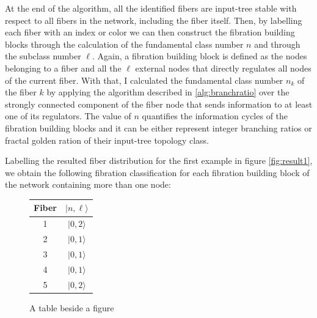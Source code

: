 \documentclass[12pt]{diazessay} %
\begin{document}
At the end of the algorithm, all the identified fibers are input-tree stable with respect to all fibers in the network, including the fiber itself. Then, by labelling each fiber with an index or color we can then construct the fibration building blocks through the calculation of the fundamental class number $n$ and through the subclass number $\ell$. Again, a fibration building block is defined as the nodes belonging to a fiber and all the $\ell$ external nodes that directly regulates all nodes of the current fiber. With that, I calculated the fundamental class number $n_k$ of the fiber $k$ by applying the algorithm described in \ref{alg:branchratio} over the strongly connected component of the fiber node that sends information to at least one of its regulators. The value of $n$ quantifies the information cycles of the fibration building blocks and it can be either represent integer branching ratios or fractal golden ration of their input-tree topology class.

Labelling the resulted fiber distribution for the first example in figure \ref{fig:result1}, we obtain the following fibration classification for each fibration building block of the network containing more than one node:

\begin{figure}[!ht]
    \centering
    \qquad
    \begin{tabular}[b]{cc}\hline
      Fiber & $| n, \ell \rangle$  \\ \hline
      1 & $| 0, 2 \rangle$ \\
      2 & $| 0, 1 \rangle$ \\
      3 & $| 0, 1 \rangle$ \\ 
      4 & $| 0, 1 \rangle$ \\
      5 & $| 0, 2 \rangle$ \\ \hline
	\end{tabular}
    \caption{A table beside a figure}
\end{figure}
\end{document}
